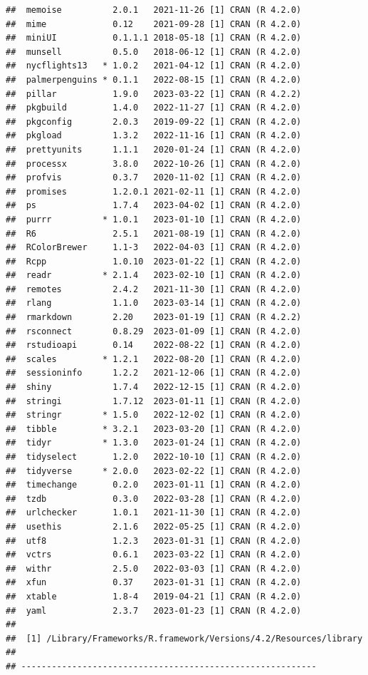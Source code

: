 \documentclass[print]{nuthesis}
\begin{document}
\begin{verbatim}
##  memoise          2.0.1   2021-11-26 [1] CRAN (R 4.2.0)
##  mime             0.12    2021-09-28 [1] CRAN (R 4.2.0)
##  miniUI           0.1.1.1 2018-05-18 [1] CRAN (R 4.2.0)
##  munsell          0.5.0   2018-06-12 [1] CRAN (R 4.2.0)
##  nycflights13   * 1.0.2   2021-04-12 [1] CRAN (R 4.2.0)
##  palmerpenguins * 0.1.1   2022-08-15 [1] CRAN (R 4.2.0)
##  pillar           1.9.0   2023-03-22 [1] CRAN (R 4.2.2)
##  pkgbuild         1.4.0   2022-11-27 [1] CRAN (R 4.2.0)
##  pkgconfig        2.0.3   2019-09-22 [1] CRAN (R 4.2.0)
##  pkgload          1.3.2   2022-11-16 [1] CRAN (R 4.2.0)
##  prettyunits      1.1.1   2020-01-24 [1] CRAN (R 4.2.0)
##  processx         3.8.0   2022-10-26 [1] CRAN (R 4.2.0)
##  profvis          0.3.7   2020-11-02 [1] CRAN (R 4.2.0)
##  promises         1.2.0.1 2021-02-11 [1] CRAN (R 4.2.0)
##  ps               1.7.4   2023-04-02 [1] CRAN (R 4.2.0)
##  purrr          * 1.0.1   2023-01-10 [1] CRAN (R 4.2.0)
##  R6               2.5.1   2021-08-19 [1] CRAN (R 4.2.0)
##  RColorBrewer     1.1-3   2022-04-03 [1] CRAN (R 4.2.0)
##  Rcpp             1.0.10  2023-01-22 [1] CRAN (R 4.2.0)
##  readr          * 2.1.4   2023-02-10 [1] CRAN (R 4.2.0)
##  remotes          2.4.2   2021-11-30 [1] CRAN (R 4.2.0)
##  rlang            1.1.0   2023-03-14 [1] CRAN (R 4.2.0)
##  rmarkdown        2.20    2023-01-19 [1] CRAN (R 4.2.2)
##  rsconnect        0.8.29  2023-01-09 [1] CRAN (R 4.2.0)
##  rstudioapi       0.14    2022-08-22 [1] CRAN (R 4.2.0)
##  scales         * 1.2.1   2022-08-20 [1] CRAN (R 4.2.0)
##  sessioninfo      1.2.2   2021-12-06 [1] CRAN (R 4.2.0)
##  shiny            1.7.4   2022-12-15 [1] CRAN (R 4.2.0)
##  stringi          1.7.12  2023-01-11 [1] CRAN (R 4.2.0)
##  stringr        * 1.5.0   2022-12-02 [1] CRAN (R 4.2.0)
##  tibble         * 3.2.1   2023-03-20 [1] CRAN (R 4.2.0)
##  tidyr          * 1.3.0   2023-01-24 [1] CRAN (R 4.2.0)
##  tidyselect       1.2.0   2022-10-10 [1] CRAN (R 4.2.0)
##  tidyverse      * 2.0.0   2023-02-22 [1] CRAN (R 4.2.0)
##  timechange       0.2.0   2023-01-11 [1] CRAN (R 4.2.0)
##  tzdb             0.3.0   2022-03-28 [1] CRAN (R 4.2.0)
##  urlchecker       1.0.1   2021-11-30 [1] CRAN (R 4.2.0)
##  usethis          2.1.6   2022-05-25 [1] CRAN (R 4.2.0)
##  utf8             1.2.3   2023-01-31 [1] CRAN (R 4.2.0)
##  vctrs            0.6.1   2023-03-22 [1] CRAN (R 4.2.0)
##  withr            2.5.0   2022-03-03 [1] CRAN (R 4.2.0)
##  xfun             0.37    2023-01-31 [1] CRAN (R 4.2.0)
##  xtable           1.8-4   2019-04-21 [1] CRAN (R 4.2.0)
##  yaml             2.3.7   2023-01-23 [1] CRAN (R 4.2.0)
## 
##  [1] /Library/Frameworks/R.framework/Versions/4.2/Resources/library
## 
## ----------------------------------------------------------
\end{verbatim}
\end{document}
